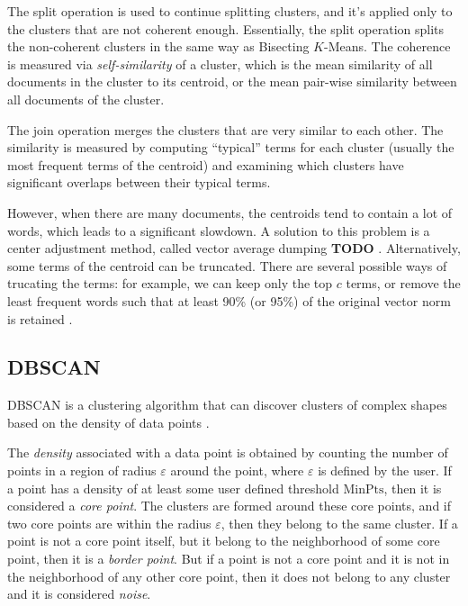 The split operation is used to continue splitting clusters,
and it's applied only to the clusters that are not coherent
enough. Essentially, the split operation splits the non-coherent
clusters in the same way as Bisecting $K$-Means.
The coherence is measured via \emph{self-similarity} of a cluster,
which is the mean similarity of all documents in the cluster to
its centroid, or the mean pair-wise similarity between all documents
of the cluster.

The join operation merges the clusters that are very similar
to each other. The similarity is measured by computing ``typical''
terms for each cluster (usually the most frequent terms of
the centroid) and examining which clusters have significant
overlaps between their typical terms.


However, when there are many documents, the centroids tend
to contain a lot of words, which leads to a significant slowdown.
A solution to this problem is a center adjustment method, called
vector average dumping \textbf{TODO} \cite{larsen1999fast}.
Alternatively, some terms of the centroid can be
truncated. There are several possible ways of trucating
the terms: for example, we can keep only the top $c$ terms, or
remove the least frequent words such that at least 90\% (or 95\%) of
the original vector norm is retained \cite{schutze1997projections}.



\subsection{DBSCAN} \label{sec:dbscan}


DBSCAN is a clustering algorithm that can discover
clusters of complex shapes based on the density of
data points \cite{ester1996density}.

The \emph{density} associated with a data point is obtained by
counting the number of points in a region of radius $\varepsilon$
around the point, where $\varepsilon$  is defined by the user.
If a point has a density of at least some user defined
threshold $\text{MinPts}$, then it is considered a \emph{core point}.
The clusters are formed around these core points, and if two core points
are within the radius $\varepsilon$, then they belong to the same cluster.
If a point is not a core point itself, but it belong to the neighborhood of some
core point, then it is a \emph{border point}. But if a point is not a core point
and it is not in the neighborhood of any other core point, then it does not
belong to any cluster and it is considered \emph{noise}.

